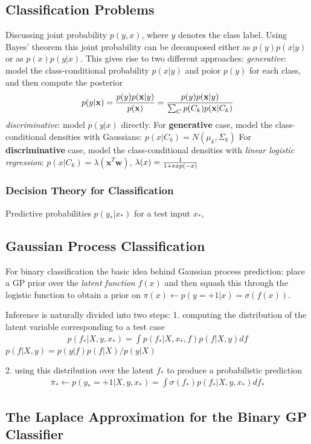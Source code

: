 \documentclass[a4paper]{article}
\begin{document}
\subsection{Classification Problems}
Discussing joint probability $p(y, x)$, where $y$ denotes the class label. Using Bayes’ theorem
this joint probability can be decomposed either as $p(y)p(x|y)$ or as $p(x)p(y|x)$. This gives rise to two different approaches:
\emph{generative}: model the class-conditional probability $p(x|y)$ and poior $p(y)$ for each class, and then compute the posterior
\begin{align}
  p(y|\mathbf{x}) = { p(y)p(\mathbf{x}|y) \over p(\mathbf{x})} = {p(y)p(\mathbf{x}|y) \over \sum_C p(C_k)p(\mathbf{x}|C_k) }
\end{align}
\emph{discriminative}: model $p(y|x)$ directly.
For \textbf{generative} case, model the class-conditional densities with Gaussians: $p(x|C_k) = N(\mu_k, \Sigma_k)$
For \textbf{discriminative} case, model the class-conditional densities with \emph{linear logistic regression}: $p(x|C_k) = \lambda(\mathbf{x}^T\mathbf{w})$, $\lambda(x) = {1 \over 1+exp(-x)} $

\subsubsection{Decision Theory for Classification}
Predictive probabilities $p(y_* |x_*)$ for a test input $x_*$,

\subsection{Gaussian Process Classification}
For binary classification the basic idea behind Gaussian process prediction:
place a GP prior over the \emph{latent function} $f(x)$ and then squash this through the logistic function to obtain a prior on $\pi(x) \gets  p(y=+1|x) = \sigma(f(x))$.

Inference is naturally divided into two steps:
1. computing the distribution of the latent variable corresponding to a test case
\begin{align}
  p(f_*|X,y,x_*) = \int p(f_*|X,x_*,f)p(f|X,y) df
\end{align}
$p(f|X,y) = p(y|f)p(f|X)/p(y|X)$

2. using this distribution over the latent $f_*$ to produce a probabilistic prediction
\begin{align}
  \overline{\pi}_* \gets p(y_*=+1|X,y,x_*) = \int \sigma(f_*)p(f_*|X,y,x_*) df_*
\end{align}


\subsection{The Laplace Approximation for the Binary GP Classifier}
\end{document}
